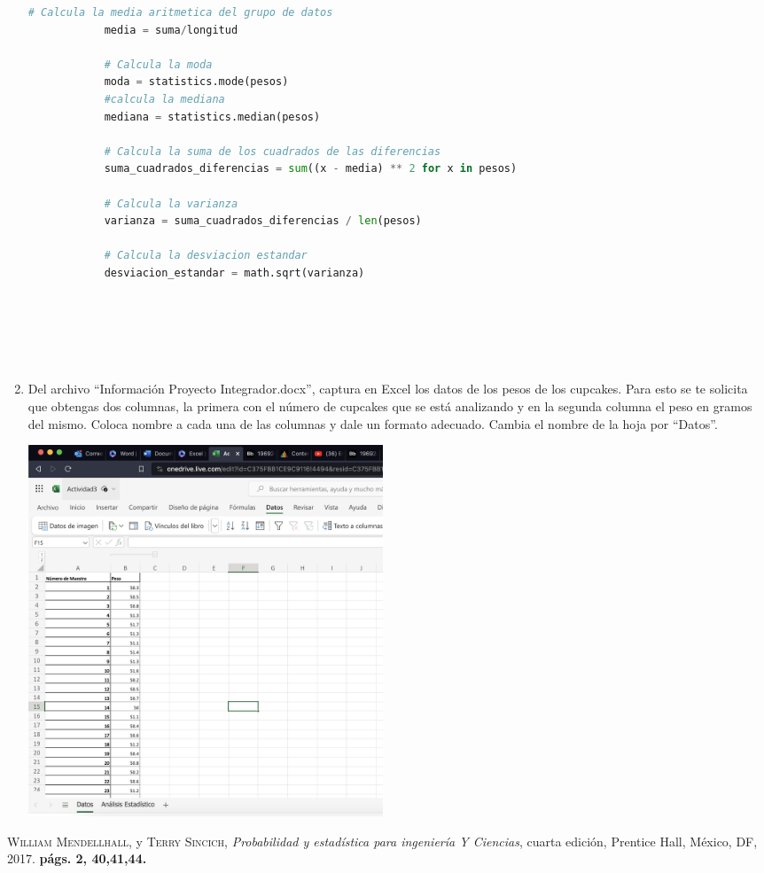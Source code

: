 \documentclass[12pt, letterpaper]{article}
\begin{document}
\begin{enumerate}
\begin{lstlisting}[language=Python]
            # Calcula la media aritmetica del grupo de datos
            media = suma/longitud

            # Calcula la moda
            moda = statistics.mode(pesos)
            #calcula la mediana
            mediana = statistics.median(pesos)

            # Calcula la suma de los cuadrados de las diferencias
            suma_cuadrados_diferencias = sum((x - media) ** 2 for x in pesos)

            # Calcula la varianza
            varianza = suma_cuadrados_diferencias / len(pesos)

            # Calcula la desviacion estandar
            desviacion_estandar = math.sqrt(varianza)

           


            
\end{lstlisting}

    
\item Del archivo “Información Proyecto Integrador.docx”, captura en Excel los datos de los pesos de los cupcakes. 
    Para esto se te solicita que obtengas dos columnas, la primera con el número de cupcakes que se está analizando 
    y en la segunda columna el peso en gramos del mismo. 
    Coloca nombre a cada una de las columnas y dale un formato adecuado. Cambia el nombre de la hoja por “Datos”.

   \begin{center}%
   \includegraphics[width=300pt]{act3_evidencia2.png}
    \end{center}
 
\end{enumerate}

 \begin{thebibliography}{Referencias}
     \textsc{William Mendellhall,} y \textsc{Terry Sincich},
    \textit{Probabilidad y estadística para ingeniería Y Ciencias}, cuarta edición,
    Prentice Hall, México, DF, 2017.  \textbf{ págs. 2, 40,41,44.}
\end{thebibliography}
   
  
\end{document}
